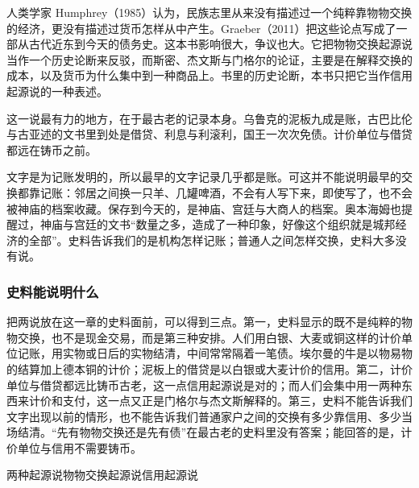 人类学家 Humphrey（1985）认为，民族志里从来没有描述过一个纯粹靠物物交换的经济，更没有描述过货币怎样从中产生\cite{humphrey1985}。Graeber（2011）把这些论点写成了一部从古代近东到今天的债务史\cite{graeber2011}。这本书影响很大，争议也大。它把物物交换起源说当作一个历史论断来反驳，而斯密、杰文斯与门格尔的论证，主要是在解释交换的成本，以及货币为什么集中到一种商品上。书里的历史论断，本书只把它当作信用起源说的一种表述。

这一说最有力的地方，在于最古老的记录本身。乌鲁克的泥板九成是账，古巴比伦与古亚述的文书里到处是借贷、利息与利滚利，国王一次次免债。计价单位与借贷都远在铸币之前。

\begin{intuition}[最早的记录为什么都是账]
文字是为记账发明的，所以最早的文字记录几乎都是账。可这并不能说明最早的交换都靠记账：邻居之间换一只羊、几罐啤酒，不会有人写下来，即使写了，也不会被神庙的档案收藏。保存到今天的，是神庙、宫廷与大商人的档案。奥本海姆也提醒过，神庙与宫廷的文书“数量之多，造成了一种印象，好像这个组织就是城邦经济的全部”\cite{polanyi1957}。史料告诉我们的是机构怎样记账；普通人之间怎样交换，史料大多没有说。
\end{intuition}

\subsubsection{史料能说明什么}
把两说放在这一章的史料面前，可以得到三点。第一，史料显示的既不是纯粹的物物交换，也不是现金交易，而是第三种安排。人们用白银、大麦或铜这样的计价单位记账，用实物或日后的实物结清，中间常常隔着一笔债。埃尔曼的牛是以物易物的结算加上德本铜的计价；泥板上的借贷是以白银或大麦计价的信用。第二，计价单位与借贷都远比铸币古老，这一点信用起源说是对的；而人们会集中用一两种东西来计价和支付，这一点又正是门格尔与杰文斯解释的。第三，史料不能告诉我们文字出现以前的情形，也不能告诉我们普通家户之间的交换有多少靠信用、多少当场结清。“先有物物交换还是先有债”在最古老的史料里没有答案；能回答的是，计价单位与信用不需要铸币。

\begin{compare}{两种起源说}{物物交换起源说}{信用起源说}
\end{compare}

